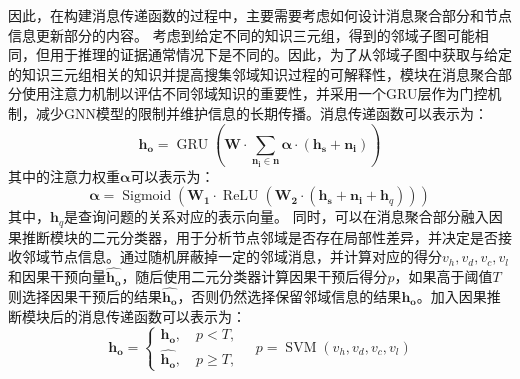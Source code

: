 \documentclass[algorithmlist, AutoFakeBold, AutoFakeSlant, figurelist, tablelist, nomlist, masters]{seuthesix}
\begin{document}
因此，在构建消息传递函数的过程中，主要需要考虑如何设计消息聚合部分和节点信息更新部分的内容。
考虑到给定不同的知识三元组，得到的邻域子图可能相同，但用于推理的证据通常情况下是不同的。因此，为了从邻域子图中获取与给定的知识三元组相关的知识并提高搜集邻域知识过程的可解释性，模块在消息聚合部分使用注意力机制以评估不同邻域知识的重要性，并采用一个GRU层作为门控机制，减少GNN模型的限制并维护信息的长期传播。消息传递函数可以表示为：
\begin{equation}
  \bm{h_o} = \operatorname{GRU}(\mathbf{W} \cdot \sum_{\bm{n_i} \in \bm{n}}{\mathbf{\alpha} \cdot (\bm{h_s} + \bm{n_i})})
  \label{equation_newMessagePassing}
\end{equation}
其中的注意力权重$\mathbf{\alpha}$可以表示为：
\begin{equation}
  \mathbf{\alpha} = \operatorname{Sigmoid}(\mathbf{W_{1}} \cdot \operatorname{ReLU}(\mathbf{W_{2}} \cdot (\bm{h_s} + \bm{n_i} + \bm{h}_q)))
  \label{equation_Alpha}
\end{equation}
其中，$\bm{h}_q$是查询问题的关系对应的表示向量。
同时，可以在消息聚合部分融入因果推断模块的二元分类器，用于分析节点邻域是否存在局部性差异，并决定是否接收邻域节点信息。通过随机屏蔽掉一定的邻域消息，并计算对应的得分$v_h, v_d, v_c, v_l$和因果干预向量$\bm{\hat{h_o}}$，随后使用二元分类器计算因果干预后得分$p$，如果高于阈值$T$则选择因果干预后的结果$\bm{\hat{h_o}}$，否则仍然选择保留邻域信息的结果$\bm{h_o}$。加入因果推断模块后的消息传递函数可以表示为：
\begin{equation}
  \bm{h_o} = \left\{\begin{array}{l}
  \bm{h_o},\quad p < T, \\
  \bm{\hat{h_o}},\quad p \geq T,
  \end{array} \quad p = \operatorname{SVM}\left(v_h, v_d, v_c, v_l\right)\right.
  \label{equation_finalMessagePassing}
\end{equation}
\end{document}
